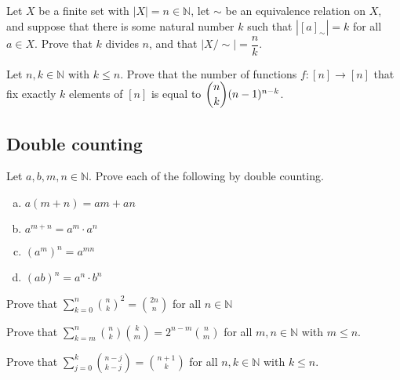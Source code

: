 \begin{chapex}
Let $X$ be a finite set with $|X| = n \in \mathbb{N}$, let $\sim$ be an equivalence relation on $X$, and suppose that there is some natural number $k$ such that $|[a]_{\sim}| = k$ for all $a \in X$. Prove that $k$ divides $n$, and that $|X/{\sim}| = \dfrac{n}{k}$.
\end{chapex}

\begin{chapex}
Let $n,k \in \mathbb{N}$ with $k \le n$. Prove that the number of functions $f : [n] \to [n]$ that fix exactly $k$ elements of $[n]$ is equal to $\dbinom{n}{k}(n-1)^{n-k}$.
\end{chapex}

\subsection*{Double counting}

\begin{chapex}
Let $a,b,m,n \in \mathbb{N}$. Prove each of the following by double counting.
\begin{multicols}{2}
\begin{enumerate}[(a)]
\item $a(m+n) = am + an$
\item $a^{m+n} = a^m \cdot a^n$
\item $(a^m)^n = a^{mn}$
\item $(ab)^n = a^n \cdot b^n$
\end{enumerate}
\end{multicols}
\end{chapex}

\begin{chapex}
Prove that $\displaystyle \sum_{k=0}^n \binom{n}{k}^2 = \binom{2n}{n}$ for all $n \in \mathbb{N}$
\end{chapex}

\begin{chapex}
Prove that $\displaystyle \sum_{k=m}^n \binom{n}{k} \binom{k}{m} = 2^{n-m} \binom{n}{m}$ for all $m,n \in \mathbb{N}$ with $m \le n$.
\end{chapex}

\begin{chapex}
Prove that $\displaystyle \sum_{j=0}^k \binom{n-j}{k-j} = \binom{n+1}{k}$ for all $n,k \in \mathbb{N}$ with $k \le n$.
\end{chapex}

